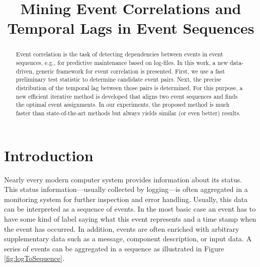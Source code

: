 \documentclass[conference]{IEEEtran}
\theoremstyle{examplestyle}
\begin{document}
\begin{acronym}
\end{acronym}



\title{Mining Event Correlations and Temporal Lags in Event Sequences}


\author{
\and
{}
}
 



\maketitle


\begin{abstract}
Event correlation is the task of detecting dependencies between events in event sequences, e.g., for predictive maintenance based on log-files.
In this work, a new data-driven, generic framework for event correlation is presented. 
First, we use a fast preliminary test statistic to determine candidate event pairs. Next, the precise distribution of the temporal lag between those pairs is determined. 
For this purpose, a new efficient iterative method is developed that aligns two event sequences and finds the optimal event assignments.
In our experiments, the proposed method is much faster than state-of-the-art methods but always yields similar (or even better) results. 
\end{abstract}






\IEEEpeerreviewmaketitle



\section{Introduction}
Nearly every modern computer system provides information about its status. This status information---usually collected by logging---is often aggregated in a monitoring system for further inspection and error handling. Usually, this data can be interpreted as a sequence of events. In the most basic case an event has to have some kind of label saying what this event represents and a time stamp when the event has occurred. In addition, events are often enriched with arbitrary supplementary data such as a message, component description, or input data. A series of events can be aggregated in a sequence as illustrated in Figure \ref{fig:logToSequence}.
\end{document}
